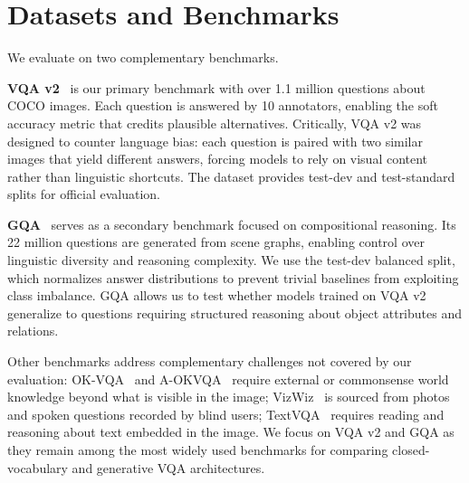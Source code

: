 \section{Datasets and Benchmarks}

We evaluate on two complementary benchmarks.

\textbf{VQA v2}~\cite{goyal2017vqav2} is our primary benchmark with over 1.1 million questions about COCO images. Each question is answered by 10 annotators, enabling the soft accuracy metric that credits plausible alternatives. Critically, VQA v2 was designed to counter language bias: each question is paired with two similar images that yield different answers, forcing models to rely on visual content rather than linguistic shortcuts. The dataset provides test-dev and test-standard splits for official evaluation.

\textbf{GQA}~\cite{hudson2019gqa} serves as a secondary benchmark focused on compositional reasoning. Its 22 million questions are generated from scene graphs, enabling control over linguistic diversity and reasoning complexity. We use the test-dev balanced split, which normalizes answer distributions to prevent trivial baselines from exploiting class imbalance. GQA allows us to test whether models trained on VQA v2 generalize to questions requiring structured reasoning about object attributes and relations.

Other benchmarks address complementary challenges not covered by our evaluation: OK-VQA~\cite{marino2019okvqa} and A-OKVQA~\cite{schwenk2022aokvqa} require external or commonsense world knowledge beyond what is visible in the image; VizWiz~\cite{gurari2018vizwiz} is sourced from photos and spoken questions recorded by blind users; TextVQA~\cite{singh2019textvqa} requires reading and reasoning about text embedded in the image. We focus on VQA v2 and GQA as they remain among the most widely used benchmarks for comparing closed-vocabulary and generative VQA architectures.
